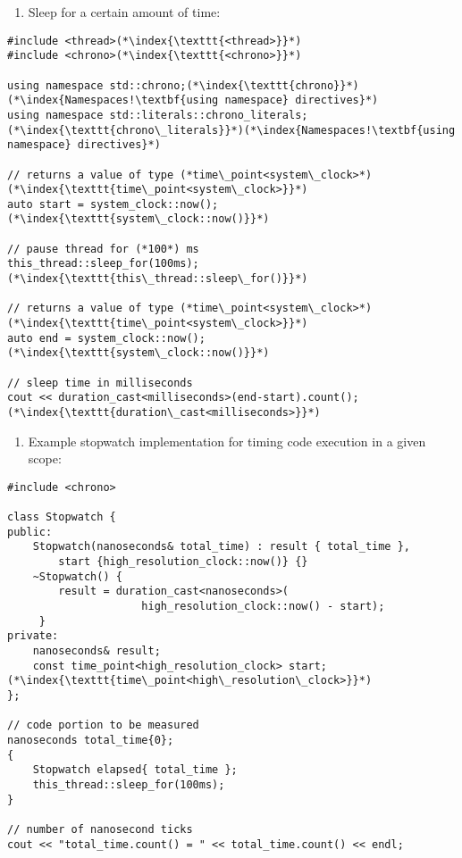 \documentclass[10pt]{article}
\begin{document}
\begin{enumerate}
\item[] Sleep for a certain amount of time:
\end{enumerate}
\begin{lstlisting}
#include <thread>(*\index{\texttt{<thread>}}*)
#include <chrono>(*\index{\texttt{<chrono>}}*)

using namespace std::chrono;(*\index{\texttt{chrono}}*)(*\index{Namespaces!\textbf{using namespace} directives}*)
using namespace std::literals::chrono_literals;(*\index{\texttt{chrono\_literals}}*)(*\index{Namespaces!\textbf{using namespace} directives}*)

// returns a value of type (*time\_point<system\_clock>*)(*\index{\texttt{time\_point<system\_clock>}}*)
auto start = system_clock::now();(*\index{\texttt{system\_clock::now()}}*)

// pause thread for (*100*) ms
this_thread::sleep_for(100ms);(*\index{\texttt{this\_thread::sleep\_for()}}*)

// returns a value of type (*time\_point<system\_clock>*)(*\index{\texttt{time\_point<system\_clock>}}*)
auto end = system_clock::now();(*\index{\texttt{system\_clock::now()}}*)

// sleep time in milliseconds
cout << duration_cast<milliseconds>(end-start).count();(*\index{\texttt{duration\_cast<milliseconds>}}*)
\end{lstlisting}
\begin{enumerate}
\item[] Example stopwatch implementation for timing code execution in a given scope:
\end{enumerate}
\begin{lstlisting}
#include <chrono>

class Stopwatch {
public:
    Stopwatch(nanoseconds& total_time) : result { total_time },
        start {high_resolution_clock::now()} {}
    ~Stopwatch() {
        result = duration_cast<nanoseconds>(
                     high_resolution_clock::now() - start);
     }
private:
    nanoseconds& result;
    const time_point<high_resolution_clock> start;(*\index{\texttt{time\_point<high\_resolution\_clock>}}*)
};

// code portion to be measured
nanoseconds total_time{0};
{
    Stopwatch elapsed{ total_time };
    this_thread::sleep_for(100ms);
}

// number of nanosecond ticks
cout << "total_time.count() = " << total_time.count() << endl;
\end{lstlisting}
\end{document}
